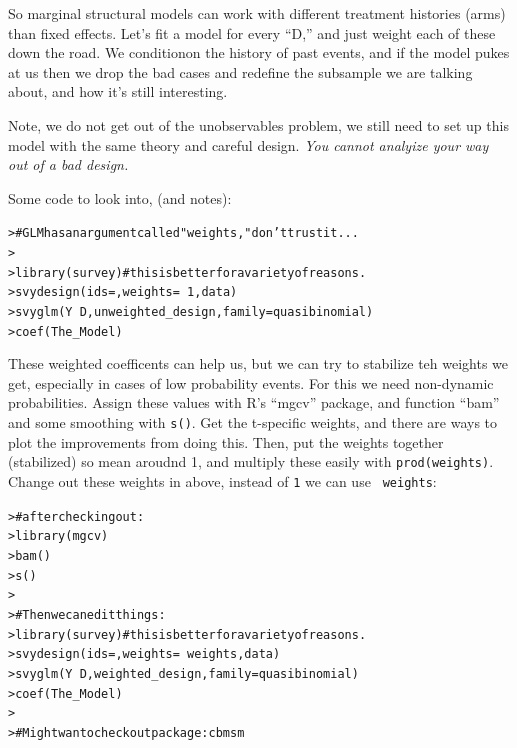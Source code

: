 \documentclass[12pt]{article}\usepackage[]{graphicx}\usepackage[]{color}
\makeatletter
\newcommand{\hlnum}[1]{\textcolor[rgb]{0.82,0.78,0.62}{#1}}%
\newcommand{\hlcom}[1]{\textcolor[rgb]{0.404,0.408,0.42}{#1}}%
\newcommand{\hlopt}[1]{\textcolor[rgb]{0.882,0.878,0.898}{#1}}%
\newcommand{\hlstd}[1]{\textcolor[rgb]{0.882,0.878,0.898}{#1}}%
\newcommand{\hlkwc}[1]{\textcolor[rgb]{0.812,0.522,0.388}{#1}}%
\newcommand{\hlkwd}[1]{\textcolor[rgb]{0.733,0.388,0.812}{#1}}%
\newenvironment{kframe}{%
 \def\at@end@of@kframe{}%
 \ifinner\ifhmode%
  \def\at@end@of@kframe{\end{minipage}}%
  \begin{minipage}{\columnwidth}%
 \fi\fi%
 \def\FrameCommand##1{\hskip\@totalleftmargin \hskip-\fboxsep
 \colorbox{shadecolor}{##1}\hskip-\fboxsep
     \hskip-\linewidth \hskip-\@totalleftmargin \hskip\columnwidth}%
 \MakeFramed {\advance\hsize-\width
   \@totalleftmargin\z@ \linewidth\hsize
   \@setminipage}}%
 {\par\unskip\endMakeFramed%
 \at@end@of@kframe}
\newenvironment{knitrout}{}{} %
\makeatother
\begin{document}
\begin{flushleft}
So marginal structural models can work with different treatment histories (arms) than fixed effects. Let's fit a model for every ``D,'' and just weight each of these down the road. We conditionon the history of past events, and if the model pukes at us then we drop the bad cases and redefine the subsample we are talking about, and how it's still interesting.

Note, we do not get out of the unobservables problem, we still need to set up this model with the same theory and careful design. \textit{You cannot analyize your way out of a bad design. }

Some code to look into, (and notes):

\begin{knitrout}
\color{fgcolor}\begin{kframe}
\begin{alltt}
\hlstd{> }\hlcom{# GLM has an argument called "weights," don't trust it...}
\hlstd{> }
\hlstd{> }\hlkwd{library}\hlstd{(survey)} \hlcom{# this is better for a variety of reasons.}
\hlstd{> }     \hlkwd{svydesign}\hlstd{(}\hlkwc{ids} \hlstd{= ,} \hlkwc{weights} \hlstd{=} \hlopt{~}\hlnum{1}\hlstd{, data)}
\hlstd{> }     \hlkwd{svyglm}\hlstd{( Y} \hlopt{~} \hlstd{D, unweighted_design,} \hlkwc{family} \hlstd{= quasibinomial)}
\hlstd{> }     \hlkwd{coef}\hlstd{(The_Model)}
\end{alltt}
\end{kframe}
\end{knitrout}

These weighted coefficents can help us, but we can try to stabilize teh weights we get, especially in cases of low probability events. For this we need non-dynamic probabilities. Assign these values with R's ``mgcv'' package, and function ``bam'' and some smoothing with \texttt{s()}. Get the t-specific weights, and there are ways to plot the improvements  from doing this. Then, put the weights together (stabilized) so mean aroudnd 1, and multiply these easily with \texttt{prod(weights)}. Change out these weights in above, instead of \texttt{1} we can use \texttt{ weights}:

\begin{knitrout}
\color{fgcolor}\begin{kframe}
\begin{alltt}
\hlstd{> }\hlcom{# after checking out:}
\hlstd{> }\hlkwd{library}\hlstd{(mgcv)}
\hlstd{> }     \hlkwd{bam}\hlstd{()}
\hlstd{> }     \hlkwd{s}\hlstd{()}
\hlstd{> }
\hlstd{> }\hlcom{# Then we can edit things:}
\hlstd{> }\hlkwd{library}\hlstd{(survey)} \hlcom{# this is better for a variety of reasons.}
\hlstd{> }     \hlkwd{svydesign}\hlstd{(}\hlkwc{ids} \hlstd{= ,} \hlkwc{weights} \hlstd{=} \hlopt{~}\hlstd{weights, data)}
\hlstd{> }     \hlkwd{svyglm}\hlstd{( Y} \hlopt{~} \hlstd{D, weighted_design,} \hlkwc{family} \hlstd{= quasibinomial)}
\hlstd{> }     \hlkwd{coef}\hlstd{(The_Model)}
\hlstd{> }
\hlstd{> }     \hlcom{# Might wan to check out package: cbmsm}
\end{alltt}
\end{kframe}
\end{knitrout}


\end{flushleft}
\end{document}
